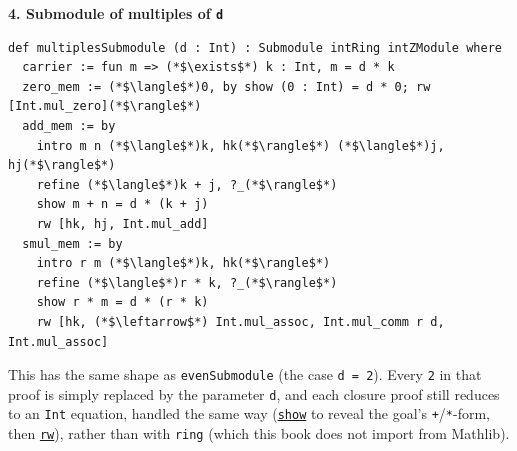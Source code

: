 \textbf{4. Submodule of multiples of \texttt{d}}

\begin{lstlisting}
def multiplesSubmodule (d : Int) : Submodule intRing intZModule where
  carrier := fun m => (*$\exists$*) k : Int, m = d * k
  zero_mem := (*$\langle$*)0, by show (0 : Int) = d * 0; rw [Int.mul_zero](*$\rangle$*)
  add_mem := by
    intro m n (*$\langle$*)k, hk(*$\rangle$*) (*$\langle$*)j, hj(*$\rangle$*)
    refine (*$\langle$*)k + j, ?_(*$\rangle$*)
    show m + n = d * (k + j)
    rw [hk, hj, Int.mul_add]
  smul_mem := by
    intro r m (*$\langle$*)k, hk(*$\rangle$*)
    refine (*$\langle$*)r * k, ?_(*$\rangle$*)
    show r * m = d * (r * k)
    rw [hk, (*$\leftarrow$*) Int.mul_assoc, Int.mul_comm r d, Int.mul_assoc]
\end{lstlisting}

This has the same shape as \texttt{evenSubmodule} (the case \texttt{d = 2}). Every \texttt{2} in that proof is simply replaced by the parameter \texttt{d}, and each closure proof still reduces to an \texttt{Int} equation, handled the same way (\href{https://lean-lang.org/doc/reference/latest/Tactic-Proofs/Tactic-Reference/}{\texttt{show}} to reveal the goal's \texttt{+}/\texttt{*}-form, then \href{https://lean-lang.org/doc/reference/latest/Tactic-Proofs/Tactic-Reference/}{\texttt{rw}}), rather than with \texttt{ring} (which this book does not import from Mathlib).
